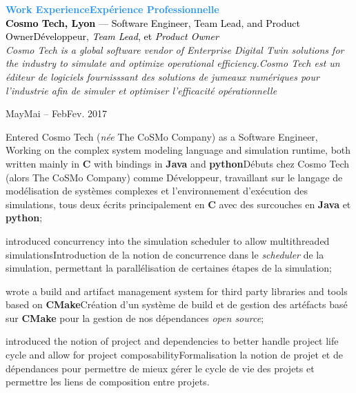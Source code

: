 \documentclass[a4paper]{article}
\newcommand\enfr[2]{\ifdefined\doen#1\else#2\fi\xspace}
\newcommand\cpplang{\textbf{C\raisebox{0.1em}{++}}\xspace}
\newcommand\cmake{\textbf{CMake}\xspace}
\newcommand\python{\textbf{python}\xspace}
\newcommand\java{\textbf{Java}\xspace}
\newcommand\heading[1]{\Large\textsf{\textbf{\textcolor{DodgerBlue}{#1}}}\normalsize}
\newcommand\entry[2]{\large\textcolor{Black}{\textbf{#1} --- #2}\normalsize}
\newcommand\timespan[2]{\normalsize\textsf{#1 -- #2}}
\begin{document}
\begin{minipage}[t]{0.63\textwidth}
\heading{\enfr{Work Experience}{Expérience Professionnelle}}\\

\entry{Cosmo Tech, Lyon}{\enfr{Software Engineer, Team Lead, and Product Owner}{Développeur, \textit{Team Lead}, et \textit{Product Owner}}}\\
\textit{\enfr{Cosmo Tech is a global software vendor of Enterprise Digital Twin
    solutions for the industry to simulate and optimize operational efficiency.}
  {Cosmo Tech est un éditeur de logiciels fournisssant des solutions de jumeaux numériques pour l'industrie afin de simuler et optimiser l’efficacité opérationnelle}}

\vspace{0.5em}
\timespan{\enfr{May}{Mai} 2014}{\enfr{Feb}{Fev}. 2017}
\begin{compactitem}
\item[\textbullet] \enfr{Entered Cosmo Tech (\textit{née} The CoSMo Company)
  as a Software Engineer, Working on the complex system modeling
  language and simulation runtime, both written mainly in \cpplang
  with bindings in \java and \python}
    {Débuts chez Cosmo Tech (alors The CoSMo Company) comme
      Développeur, travaillant sur le langage de modélisation de
      systèmes complexes et l’environnement d'exécution des
      simulations, tous deux écrits principalement en \cpplang avec
      des surcouches en \java et \python};
\item[\textbullet] \enfr{introduced concurrency into the simulation
  scheduler to allow multithreaded simulations}
  {Introduction de la notion de concurrence dans le \textit{scheduler}
    de la simulation, permettant la parallélisation de certaines
    étapes de la simulation};
\item[\textbullet] \enfr{wrote a build and artifact management system
  for third party libraries and tools based on \cmake}
  {Création d'un système de build et de gestion des artéfacts basé sur
    \cmake pour la gestion de nos dépendances \textit{open source}};
\item[\textbullet] \enfr{introduced the notion of project and
  dependencies to better handle project life cycle and allow for
  project composability}
  {Formalisation la notion de projet et de dépendances pour permettre
    de mieux gérer le cycle de vie des projets et permettre les liens
    de composition entre projets}.
\end{compactitem}


\end{minipage}
\end{document}
